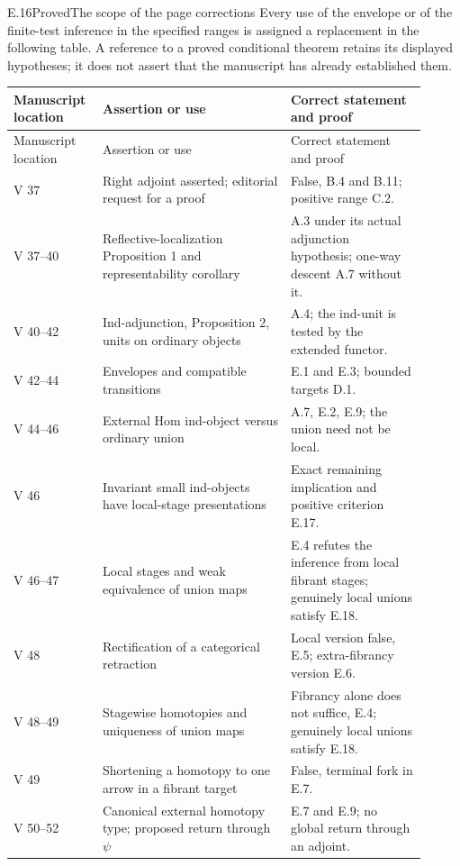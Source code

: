 \begin{claim}{E.16}{Proved}{The scope of the page corrections}
Every use of the envelope or of the finite-test inference in the specified ranges is assigned a replacement in the following table. A reference to a proved conditional theorem retains its displayed hypotheses; it does not assert that the manuscript has already established them.
\end{claim}
\begin{center}\small
\begin{longtable}{L{0.17\linewidth}L{0.43\linewidth}L{0.31\linewidth}}
\toprule
Manuscript location & Assertion or use & Correct statement and proof\\\midrule
\endfirsthead
\toprule Manuscript location&Assertion or use&Correct statement and proof\\\midrule\endhead
V 37 & Right adjoint asserted; editorial request for a proof & False, B.4 and B.11; positive range C.2.\\
V 37--40 & Reflective-localization Proposition 1 and representability corollary & A.3 under its actual adjunction hypothesis; one-way descent A.7 without it.\\
V 40--42 & Ind-adjunction, Proposition 2, units on ordinary objects & A.4; the ind-unit is tested by the extended functor.\\
V 42--44 & Envelopes and compatible transitions & E.1 and E.3; bounded targets D.1.\\
V 44--46 & External Hom ind-object versus ordinary union & A.7, E.2, E.9; the union need not be local.\\
V 46 & Invariant small ind-objects have local-stage presentations & Exact remaining implication and positive criterion E.17.\\
V 46--47 & Local stages and weak equivalence of union maps & E.4 refutes the inference from local fibrant stages; genuinely local unions satisfy E.18.\\
V 48 & Rectification of a categorical retraction & Local version false, E.5; extra-fibrancy version E.6.\\
V 48--49 & Stagewise homotopies and uniqueness of union maps & Fibrancy alone does not suffice, E.4; genuinely local unions satisfy E.18.\\
V 49 & Shortening a homotopy to one arrow in a fibrant target & False, terminal fork in E.7.\\
V 50--52 & Canonical external homotopy type; proposed return through $\psi$ & E.7 and E.9; no global return through an adjoint.\\

\end{longtable}
\end{center}
